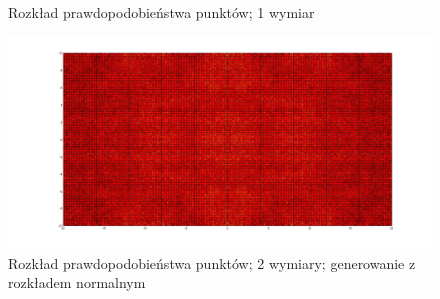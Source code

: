 \documentclass{mini}
\begin{document}
\begin{figure}[H]
\centering
{}
\quad
{}
\caption{Rozkład prawdopodobieństwa punktów; 1 wymiar}
\end{figure}

\begin{figure}[H]
\centering
\includegraphics[width=\textwidth]{c_n_10M_2__20_20__10_10_4}
\caption{Rozkład prawdopodobieństwa punktów; 2 wymiary; generowanie z rozkładem normalnym}
\end{figure}
\end{document}
